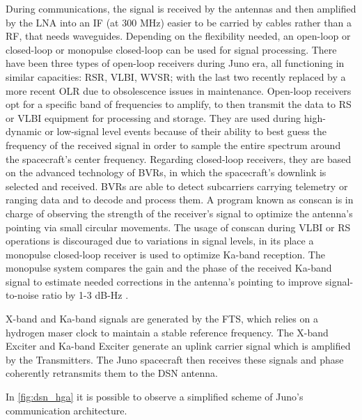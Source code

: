 During communications, the signal is received by the antennas and then amplified by the LNA into an IF (at 300 MHz) easier to be carried by cables rather than a RF, that needs waveguides. Depending on the flexibility needed, an open-loop or closed-loop or monopulse closed-loop can be used for signal processing. There have been three types of open-loop receivers during Juno era, all functioning in similar capacities: RSR, VLBI, WVSR; with the last two recently replaced by a more recent OLR due to obsolescence issues in maintenance\cite{communication_support}. Open-loop receivers opt for a specific band of frequencies to amplify, to then transmit the data to RS or VLBI equipment for processing and storage. They are used during high-dynamic or low-signal level events because of their ability to best guess the frequency of the received signal in order to sample the entire spectrum around the spacecraft's center frequency. Regarding closed-loop receivers, they are based on the advanced technology of BVRs, in which the spacecraft's downlink is selected and received. BVRs are able to detect subcarriers carrying telemetry or ranging data and to decode and process them. A program known as conscan \cite{dsn_sito} is in charge of observing the strength of the receiver's signal to optimize the antenna's pointing via small circular movements. The usage of conscan during VLBI or RS operations is discouraged due to variations in signal levels, in its place a monopulse closed-loop receiver is used to optimize Ka-band reception. The monopulse system compares the gain and the phase of the received Ka-band signal to estimate needed corrections in the antenna's pointing to improve signal-to-noise ratio by 1-3 dB-Hz \cite{ka_uplink}.

X-band and Ka-band signals are generated by the FTS, which relies on a hydrogen maser clock to maintain a stable reference frequency. The X-band Exciter and Ka-band Exciter generate an uplink carrier signal which is amplified by the Transmitters. The Juno spacecraft then receives these signals and phase coherently retransmits them to the DSN antenna.





In \autoref{fig:dsn_hga} it is possible to observe a simplified scheme of Juno's communication architecture.

